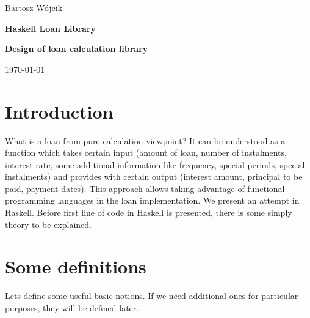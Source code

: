 \documentclass[letterpaper,11pt]{article}
\def\name{Bartosz W\'{o}jcik}
\def\title{Haskell Loan Library}
\def\subtitle{Design of loan calculation library}
\begin{document}

\centerline{\huge \name}
\vspace{0.25in}           
\centerline{\huge \bf \title}
\vspace{0.25in}
\centerline{\Large \bf \subtitle}
\vspace{0.25in}
\centerline{\large \today}

\vspace{1in}

\begin {abstract}
Loan calculation can be simply understood as providing for given input the amortization schedule. Amortization schedule often happens to bring unexpected problems: works fine until operates in domain of real numbers. Once domain is changed to one accepted by accounting, it stops amortizing or amortizes with some ugly remainder, which is officially ignored and silently removed "somehow".
We describe in this paper the general way of loan calculation which operates in domain of integers and doesn't have problem of amortization remainder. We define the properties amortization schedule has to fulfil.
Finally we design library and its API.
\end {abstract}

\tableofcontents
\setcounter{tocdepth}{4}

\clearpage


\section{Introduction}

What is a loan from pure calculation viewpoint? It can be understood as a function which takes certain input (amount of loan, number of instalments, interest rate, some additional information like frequency, special periods, special instalments) and provides with certain output (interest amount, principal to be paid, payment dates). This approach allows taking advantage of functional programming languages in the loan implementation. We present an attempt in Haskell. Before first line of code in Haskell is presented, there is some simply theory to be explained.


\section{Some definitions}

Lets define some useful basic notions. If we need additional ones for particular purposes, they will be defined later.
\end{document}
